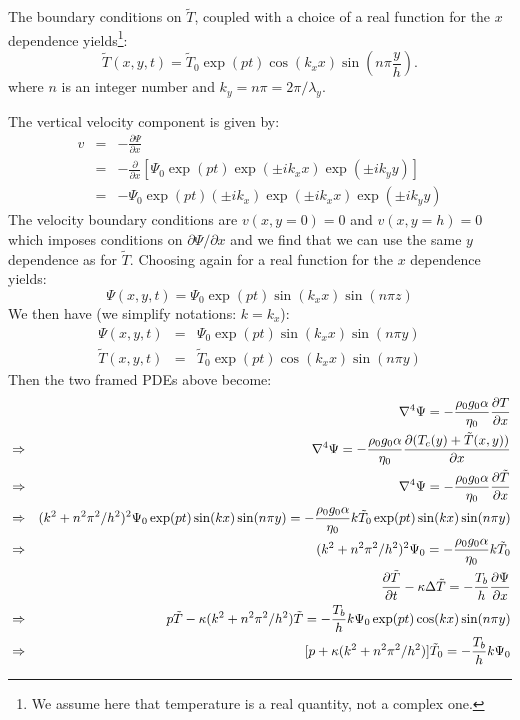 The boundary conditions on $\tilde{T}$, 
coupled with a choice of a real function for the $x$ dependence 
yields\footnote{We assume here that temperature is a real quantity, not a complex one.}:
\[
\tilde{T}(x,y,t) = \tilde{T}_0 \exp(pt) \cos (k_x x) \sin \left(n\pi \frac{y}{h} \right).
\]
where $n$ is an integer number and $k_y=n \pi = 2 \pi/ \lambda_y$. 

The vertical velocity component is given by:
\begin{eqnarray}
v &=& -\frac{\partial \Psi}{\partial x}  \\
  &=& -\frac{\partial }{\partial x} \left[  \Psi_0 \exp(pt)\exp(\pm i k_x x) \exp(\pm i k_y y) \right] \\
  &=& - \Psi_0 \exp(pt) (\pm i k_x) \exp(\pm i k_x x) \exp(\pm i k_y y)
\end{eqnarray}
The velocity boundary conditions are $v(x,y=0)=0$ and $v(x,y=h)=0$ 
which imposes conditions on $\partial \Psi/\partial x$ and we find that we 
can use the same $y$ dependence as for $\tilde{T}$. 
Choosing again for a real function for the $x$ dependence yields:
\[
\Psi(x,y,t) = \Psi_0 \exp(pt) \sin(k_x x) \sin(n\pi z)
\]
We then have (we simplify notations: $k=k_x$):
\begin{eqnarray}
\Psi(x,y,t) &=& \Psi_0 \exp(pt)  \sin(k_x x) \sin(n\pi y)  \\
\tilde{T}(x,y,t)  &=& \tilde{T}_0 \exp(pt)  \cos(k_x x) \sin(n\pi y)   
\end{eqnarray}
Then the two framed PDEs above become:
\begin{eqnarray}
&& \nabla^4 \Psi= -\frac{\rho_0 g_0 \alpha}{\eta_0} \frac{\partial T}{\partial x} \nonumber \\
&\Rightarrow& \nabla^4 \Psi= -\frac{\rho_0 g_0 \alpha}{\eta_0} 
\frac{\partial (T_c(y)+\tilde{T}(x,y))}{\partial x} \nonumber \\
&\Rightarrow& \nabla^4 \Psi= -\frac{\rho_0 g_0 \alpha}{\eta_0} \frac{\partial \tilde{T}}{\partial x} \nonumber \\
&\Rightarrow& 
(k^2 + n^2 \pi^2/h^2)^2 \Psi_0 \exp(pt)  \sin(k x) \sin(n\pi y) = -\frac{\rho_0 g_0 \alpha}{\eta_0} 
 k \tilde{T}_0 \exp(pt)  \sin(k x) \sin(n\pi y) \nonumber \\ 
&\Rightarrow& (k^2 + n^2 \pi^2/h^2)^2 \Psi_0     = -\frac{\rho_0 g_0 \alpha}{\eta_0}  k \tilde{T}_0  
\nonumber\\ 
&& \frac{\partial \tilde{T}}{\partial t} - \kappa \Delta \tilde{T} 
= -  \frac{T_b}{h}   \frac{\partial \Psi}{\partial x} \nonumber\\
&\Rightarrow & p \tilde{T} - \kappa (k^2 + n^2\pi^2/h^2) \tilde{T}   
= -  \frac{T_b}{h} k \Psi_0 \exp(pt)  \cos(k x) \sin(n\pi y)\nonumber \\
&\Rightarrow & [ p + \kappa (k^2 + n^2\pi^2/h^2) ] \tilde{T}_0   
= -  \frac{T_b}{h} k \Psi_0 \nonumber
\end{eqnarray}
 
